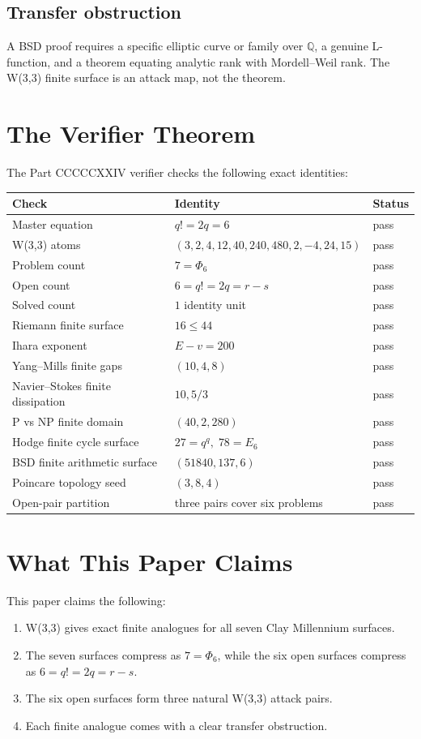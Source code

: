 \documentclass[11pt]{article}
\theoremstyle{definition}
\newcommand{\Q}{\mathbb{Q}}
\newcommand{\PhiSix}{\Phi_6}
\begin{document}
\subsection{Transfer obstruction}

A BSD proof requires a specific elliptic curve or family over \(\Q\), a genuine L-function, and a theorem equating analytic rank with Mordell--Weil rank.  The W(3,3) finite surface is an attack map, not the theorem.

\section{The Verifier Theorem}

The Part CCCCCXXIV verifier checks the following exact identities:
\begin{longtable}{lll}
\toprule
Check & Identity & Status \\
\midrule
Master equation & \(q!=2q=6\) & pass \\
W(3,3) atoms & \((3,2,4,12,40,240,480,2,-4,24,15)\) & pass \\
Problem count & \(7=\PhiSix\) & pass \\
Open count & \(6=q!=2q=r-s\) & pass \\
Solved count & \(1\) identity unit & pass \\
Riemann finite surface & \(16\le 44\) & pass \\
Ihara exponent & \(E-v=200\) & pass \\
Yang--Mills finite gaps & \((10,4,8)\) & pass \\
Navier--Stokes finite dissipation & \(10,5/3\) & pass \\
P vs NP finite domain & \((40,2,280)\) & pass \\
Hodge finite cycle surface & \(27=q^q,\;78=E_6\) & pass \\
BSD finite arithmetic surface & \((51840,137,6)\) & pass \\
Poincare topology seed & \((3,8,4)\) & pass \\
Open-pair partition & three pairs cover six problems & pass \\
\bottomrule
\end{longtable}

\section{What This Paper Claims}

This paper claims the following:
\begin{enumerate}[leftmargin=2em]
  \item W(3,3) gives exact finite analogues for all seven Clay Millennium surfaces.
  \item The seven surfaces compress as \(7=\PhiSix\), while the six open surfaces compress as \(6=q!=2q=r-s\).
  \item The six open surfaces form three natural W(3,3) attack pairs.
  \item Each finite analogue comes with a clear transfer obstruction.
\end{enumerate}
\end{document}
